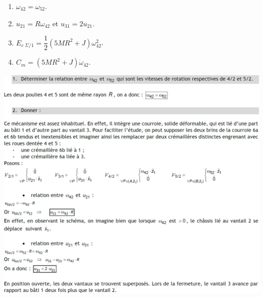 \documentclass[10pt,fleqn]{article} %
\begin{document}
\begin{multicols}{2}
\begin{enumerate}
\item $\omega_{42}=\omega_{52}$.
\item $u_{21}=R\omega_{42}$ et $u_{31}=2u_{21}$.
\item $E_{c\; \Sigma/1} = \dfrac{1}{2}\left(5MR^2+J\right)\omega_{42}^2$.
\item $C_m=\left(5MR^2+J\right)\dot{\omega}_{42}$.
\end{enumerate}

\ifprof
\else
\end{multicols}
\fi

\newpage

\begin{center}
\includegraphics[width=\linewidth]{images/cor_01.png}
\end{center}
\end{document}
